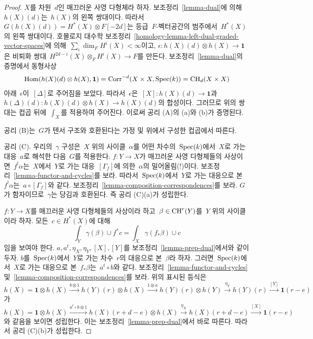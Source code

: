 \begin{proof}
\medskip\noindent
$X$를 차원\  $d$인 매끄러운 사영 다형체라 하자.
보조정리\  \ref{lemma-dual}에 의해\  $h(X)(d)$는\  $h(X)$의 왼쪽
쌍대이다. 따라서\ 
$G(h(X)(d)) = H^*(X) \otimes F[-2d]$는 등급\  $F$-벡터공간의 범주에서\ 
$H^*(X)$의 왼쪽 쌍대이다. 호몰로지 대수학 보조정리\ 
\ref{homology-lemma-left-dual-graded-vector-spaces}에 의해\ 
$\sum_i \dim_F H^i(X) < \infty$이고,
$\epsilon : h(X)(d) \otimes h(X) \to \mathbf{1}$은 비퇴화 쌍대\ 
$H^{2d - i}(X) \otimes_F H^i(X) \to F$를 만든다. 보조정리\ 
\ref{lemma-dual}의 증명에서 동형사상
$$
\mathop{\mathrm{Hom}}\nolimits(h(X)(d) \otimes h(X), \mathbf{1}) =
\text{Corr}^{-d}(X \times X, \mathop{\mathrm{Spec}}(k)) =
\mathop{\mathrm{CH}}\nolimits_d(X \times X)
$$
아래\  $\epsilon$이\  $[\Delta]$로 주어짐을 보았다. 따라서\ 
$\epsilon$은\  $[X] : h(X)(d) \to \mathbf{1}$과\ 
$h(\Delta)(d) : h(X)(d) \otimes h(X) \to h(X)(d)$의 합성이다.
그러므로 위의 쌍대는 컵곱 뒤에\  $\int_X$를 적용하여 주어진다.
이로써 공리 (A)의 (a)와 (b)가 증명된다.

\medskip\noindent
공리 (B)는\  $G$가 텐서 구조와 호환된다는 가정 및 위에서 구성한
컵곱에서 따른다.

\medskip\noindent
공리 (C). 우리의\  $\gamma$ 구성은\  $X$ 위의 사이클\  $\alpha$를 어떤
차수의\  $\mathop{\mathrm{Spec}}(k)$에서\  $X$로 가는 대응\  $a$로 해석한 다음\  $G$를
적용한다. $f : Y \to X$가 매끄러운 사영 다형체들의 사상이면\ 
$f^!\alpha$는\  $X$에서\  $Y$로 가는 대응\  $[\Gamma_f]$에 의한\ 
$\alpha$의 밀어올림(!)이다. 보조정리\ 
\ref{lemma-functor-and-cycles}를 보라. 따라서\  $\mathop{\mathrm{Spec}}(k)$에서\  $Y$로
가는 대응으로 본\  $f^!\alpha$는\  $a \circ [\Gamma_f]$와 같다.
보조정리\  \ref{lemma-composition-correspondences}를 보라.
$G$가 함자이므로\  $\gamma$는 당김과 호환된다. 즉 공리 (C)(a)가 성립한다.

\medskip\noindent
$f : Y \to X$를 매끄러운 사영 다형체들의 사상이라 하고\ 
$\beta \in \mathop{\mathrm{CH}}\nolimits^r(Y)$를\  $Y$ 위의 사이클이라 하자. 모든\ 
$c \in H^*(X)$에 대해
$$
\int_Y \gamma(\beta) \cup f^*c = \int_X \gamma(f_*\beta) \cup c
$$
임을 보여야 한다. $a, a^t, \eta_X, \eta_Y, [X], [Y]$를
보조정리\  \ref{lemma-prep-dual}에서와 같이 두자. $b$를\ 
$\mathop{\mathrm{Spec}}(k)$에서\  $Y$로 가는 차수\  $r$의 대응으로 본\  $\beta$라 하자.
그러면\  $\mathop{\mathrm{Spec}}(k)$에서\  $X$로 가는 대응으로 본\  $f_*\beta$는\ 
$a^t \circ b$와 같다. 보조정리\ 
\ref{lemma-functor-and-cycles} 및\ 
\ref{lemma-composition-correspondences}를 보라.
위의 표시된 등식은
$$
h(X) = \mathbf{1} \otimes h(X)
\xrightarrow{b \otimes 1}
h(Y)(r) \otimes h(X)
\xrightarrow{1 \otimes a}
h(Y)(r) \otimes h(Y)
\xrightarrow{\eta_Y}
h(Y)(r)
\xrightarrow{[Y]}
\mathbf{1}(r - e)
$$
가
$$
h(X) = \mathbf{1} \otimes h(X)
\xrightarrow{a^t \circ b \otimes 1}
h(X)(r + d - e) \otimes h(X)
\xrightarrow{\eta_X}
h(X)(r + d - e)
\xrightarrow{[X]}
\mathbf{1}(r - e)
$$
와 같음을 보이면 성립한다. 이는 보조정리\ 
\ref{lemma-prep-dual}에서 바로 따른다. 따라서 공리 (C)(b)가 성립한다.


\end{proof}
